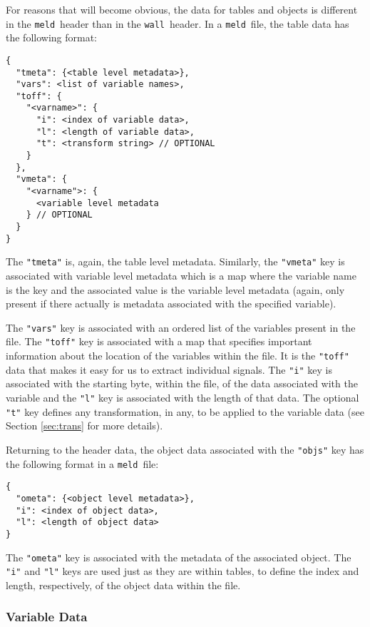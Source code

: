 \documentclass[11pt,a4paper,twocolumn]{article}
\newcommand{\wall}{\texttt{wall}}
\newcommand{\meld}{\texttt{meld}}
\newcommand{\code}[1]{\texttt{#1}} %
\begin{document}
For reasons that will become obvious, the data for tables and objects
is different in the \meld\ header than in the \wall\ header.  In a
\meld\ file, the table data has the following format:

\begin{verbatim}
{
  "tmeta": {<table level metadata>},
  "vars": <list of variable names>,
  "toff": {
    "<varname>": {
      "i": <index of variable data>,
      "l": <length of variable data>,
      "t": <transform string> // OPTIONAL
    }
  },
  "vmeta": {
    "<varname">: {
      <variable level metadata
    } // OPTIONAL
  }
}
\end{verbatim}

The \code{"tmeta"} is, again, the table level metadata.  Similarly,
the \code{"vmeta"} key is associated with variable level metadata
which is a map where the variable name is the key and the associated
value is the variable level metadata (again, only present if there
actually is metadata associated with the specified variable).

The \code{"vars"} key is associated with an ordered list of the
variables present in the file.  The \code{"toff"} key is associated
with a map that specifies important information about the location of
the variables within the file.  It is the \code{"toff"} data that
makes it easy for us to extract individual signals.  The \code{"i"}
key is associated with the starting byte, within the file, of the data
associated with the variable and the \code{"l"} key is associated with
the length of that data.  The optional \code{"t"} key defines any
transformation, in any, to be applied to the variable data (see
Section \ref{sec:trans} for more details).

Returning to the header data, the object data associated with the
\code{"objs"} key has the following format in a \meld\ file:

\begin{verbatim}
{
  "ometa": {<object level metadata>},
  "i": <index of object data>,
  "l": <length of object data>
}
\end{verbatim}

The \code{"ometa"} key is associated with the metadata of the
associated object.  The \code{"i"} and \code{"l"} keys are used just
as they are within tables, to define the index and length,
respectively, of the object data within the file.

\subsubsection{Variable Data}
\end{document}
